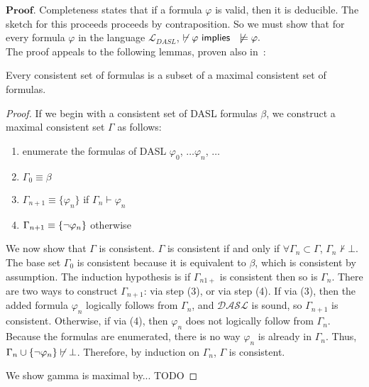 $\mathbf{Proof}.$ Completeness states that if a formula $\varphi$ is valid, then it is deducible. The sketch for this proceeds proceeds by contraposition. So we must show that for every formula $\varphi$ in the language $\mathcal{L}_{DASL}$, $\not\vdash\varphi \textsf{\ implies \ } \not\models\varphi.$\\
The proof appeals to the following lemmas, proven also in~\cite{DEL,negri}:
\begin{lemma}[Lindenbaum]
Every consistent set of formulas is a subset of a maximal consistent set of formulas.
\end{lemma}
\begin{proof}
	
If we begin with a consistent set of DASL formulas $\beta$, we construct a maximal consistent set $\Gamma$ as follows:
\begin{enumerate}
	\item enumerate the formulas of DASL $\varphi_0$, $\dots \varphi_n$, $\dots$
	\item $\Gamma_0 \equiv \beta$
	\item $\Gamma_{n+1} \equiv \{\varphi_n\}$ if $\Gamma_{n} \vdash \varphi_n$ 
	\item $\Gamma_{n+1} \equiv \{{\neg} \varphi_n\}$ otherwise
\end{enumerate}

We now show that $\Gamma$ is consistent. $\Gamma$ is consistent if and only if $\forall \Gamma_n \subset \Gamma$, $\Gamma_n \not\vdash \bot$. The base set $\Gamma_0$ is consistent because it is equivalent to $\beta$, which is consistent by assumption. The induction hypothesis is if $\Gamma_{n1+}$ is consistent then so is $\Gamma_{n}$. There are two ways to construct $\Gamma_{n+1}$: via step (3), or via step (4). If via (3), then the added formula $\varphi_n$ logically follows from $\Gamma_n$, and $\mathcal{DASL}$ is sound, so $\Gamma_{n+1}$ is consistent. Otherwise, if via (4), then $\varphi_n$ does not logically follow from $\Gamma_n$. Because the formulas are enumerated, there is no way $\varphi_n$ is already in $\Gamma_n$. Thus, $\Gamma_n \cup \{{\neg}\varphi_n\} \not\vdash \bot$. Therefore, by induction on $\Gamma_n$, $\Gamma$ is consistent.

We show gamma is maximal by... TODO
\end{proof}

